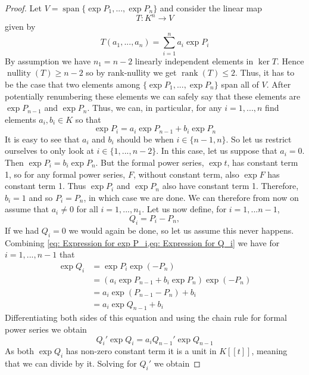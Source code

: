 \documentclass{article}
\DeclareMathOperator{\rank}{rank}
\DeclareMathOperator{\nullity}{nullity}
\newcommand{\Span}{\operatorname{span}}
\numberwithin{equation}{section}
\begin{document}
\begin{proof}
    Let $V = \Span \{ \exp P_1,...,\exp P_n\}$ and consider the linear map $$T : K^n \to V$$ given by
    $$T(a_1, ..., a_n) = \sum_{i=1}^n a_i \exp P_i$$
    By assumption we have $n_1 = n - 2$ linearly independent elements in $\ker T$. Hence $\nullity (T) \geq n-2$ so by rank-nullity we get $\rank (T) \leq 2$. Thus, it has to be the case that two elements among $\{\exp P_1,...,\exp P_n \}$ span all of $V$. After potentially renumbering these elements we can safely say that these elements are $\exp{P_{n-1}}$ and $\exp{P_{n}}$. Thus, we can, in particular, for any $i = 1, ..., n$ find elements $a_i, b_i \in K$ so that
    \begin{equation} \label{eq: Expression for exp P_i}
        \exp P_i = a_i \exp P_{n-1} + b_i \exp P_n
    \end{equation}
    It is easy to see that $a_i$ and $b_i$ should be when $i \in \{n-1, n\}$. So let us restrict ourselves to only look at $i \in \{1, ..., n-2\}$. In this case, let us suppose that $a_i = 0$. Then $\exp P_i = b_i \exp P_n$. But the formal power series, $\exp t$, has constant term 1, so for any formal power series, $F$, without constant term, also $\exp F$ has constant term 1. Thus $\exp P_i$ and $\exp P_n$ also have constant term 1. Therefore, $b_i = 1$ and so $P_i = P_n$, in which case we are done. We can therefore from now on assume that $a_i \neq 0$ for all $i = 1, ..., n_1$. Let us now define, for $i = 1, ... n-1$,
    \begin{equation}\label{eq: Expression for Q_i}
        Q_i = P_i - P_n,
    \end{equation}
    If we had $Q_i = 0$ we would again be done, so let us assume this never happens. Combining \cref{eq: Expression for exp P_i,eq: Expression for Q_i} we have for $i = 1, ..., n-1$ that
    \begin{align*}
        \exp Q_i & = \exp P_i \exp (-P_n)                          \\
                 & = (a_i \exp P_{n-1} + b_i \exp P_n) \exp (-P_n) \\
                 & = a_i \exp (P_{n-1} - P_n) + b_i                \\
                 & = a_i \exp Q_{n-1} + b_i
    \end{align*}
    Differentiating both sides of this equation and using the chain rule for formal power series we obtain
    $$Q_i' \exp Q_i = a_i Q_{n-1}' \exp Q_{n-1}$$
    As both $\exp Q_i$ has non-zero constant term it is a unit in $K[[t]]$, meaning that we can divide by it. Solving for $Q_i'$ we obtain

\end{proof}
\end{document}
